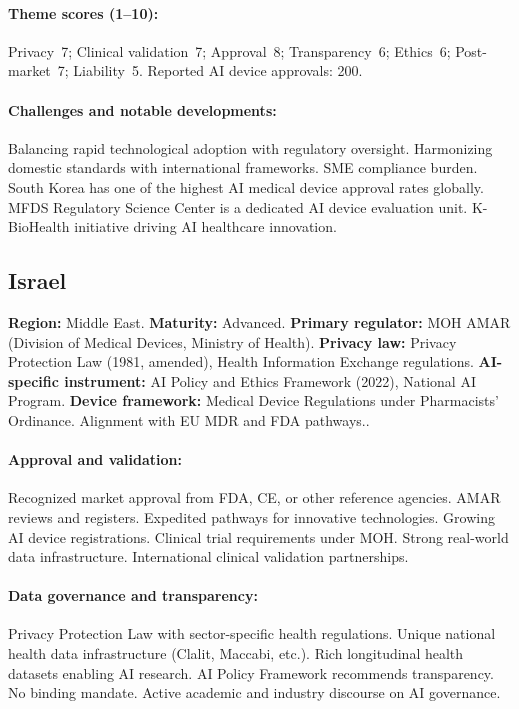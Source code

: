{\paragraph{Theme scores (1--10):}
Privacy~7;
Clinical validation~7;
Approval~8;
Transparency~6;
Ethics~6;
Post-market~7;
Liability~5.
Reported AI device approvals: 200.

\paragraph{Challenges and notable developments:}
Balancing rapid technological adoption with regulatory oversight. Harmonizing domestic standards with international frameworks. SME compliance burden.
South Korea has one of the highest AI medical device approval rates globally. MFDS Regulatory Science Center is a dedicated AI device evaluation unit. K-BioHealth initiative driving AI healthcare innovation.


\subsection{Israel}
\textbf{Region:} Middle East.
\textbf{Maturity:} Advanced.
\textbf{Primary regulator:} MOH AMAR (Division of Medical Devices, Ministry of Health).
\textbf{Privacy law:} Privacy Protection Law (1981, amended), Health Information Exchange regulations.
\textbf{AI-specific instrument:} AI Policy and Ethics Framework (2022), National AI Program.
\textbf{Device framework:} Medical Device Regulations under Pharmacists' Ordinance. Alignment with EU MDR and FDA pathways..

\paragraph{Approval and validation:}
Recognized market approval from FDA, CE, or other reference agencies. AMAR reviews and registers. Expedited pathways for innovative technologies. Growing AI device registrations.
Clinical trial requirements under MOH. Strong real-world data infrastructure. International clinical validation partnerships.

\paragraph{Data governance and transparency:}
Privacy Protection Law with sector-specific health regulations. Unique national health data infrastructure (Clalit, Maccabi, etc.). Rich longitudinal health datasets enabling AI research.
AI Policy Framework recommends transparency. No binding mandate. Active academic and industry discourse on AI governance.

}
